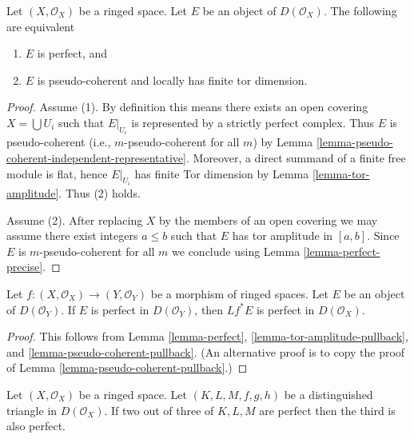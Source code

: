\begin{lemma}
\label{lemma-perfect}
Let $(X, \mathcal{O}_X)$ be a ringed space.
Let $E$ be an object of $D(\mathcal{O}_X)$.
The following are equivalent
\begin{enumerate}
\item $E$ is perfect, and
\item $E$ is pseudo-coherent and locally has finite tor dimension.
\end{enumerate}
\end{lemma}

\begin{proof}
Assume (1). By definition this means there exists an open covering
$X = \bigcup U_i$ such that $E|_{U_i}$ is represented by a
strictly perfect complex. Thus $E$ is pseudo-coherent (i.e.,
$m$-pseudo-coherent for all $m$) by
Lemma \ref{lemma-pseudo-coherent-independent-representative}.
Moreover, a direct summand of a finite free module is flat, hence
$E|_{U_i}$ has finite Tor dimension by
Lemma \ref{lemma-tor-amplitude}. Thus (2) holds.

\medskip\noindent
Assume (2). After replacing $X$ by the members of an open covering
we may assume there exist integers $a \leq b$ such that $E$
has tor amplitude in $[a, b]$. Since $E$ is $m$-pseudo-coherent
for all $m$ we conclude using Lemma \ref{lemma-perfect-precise}.
\end{proof}

\begin{lemma}
\label{lemma-perfect-pullback}
Let $f : (X, \mathcal{O}_X) \to (Y, \mathcal{O}_Y)$ be a morphism of ringed
spaces. Let $E$ be an object of $D(\mathcal{O}_Y)$. If $E$ is perfect in
$D(\mathcal{O}_Y)$, then $Lf^*E$ is perfect in $D(\mathcal{O}_X)$.
\end{lemma}

\begin{proof}
This follows from Lemma \ref{lemma-perfect},
\ref{lemma-tor-amplitude-pullback}, and
\ref{lemma-pseudo-coherent-pullback}.
(An alternative proof is to copy the proof of
Lemma \ref{lemma-pseudo-coherent-pullback}.)
\end{proof}

\begin{lemma}
\label{lemma-two-out-of-three-perfect}
Let $(X, \mathcal{O}_X)$ be a ringed space. Let $(K, L, M, f, g, h)$
be a distinguished triangle in $D(\mathcal{O}_X)$. If two out of three of
$K, L, M$ are perfect then the third is also perfect.
\end{lemma}

